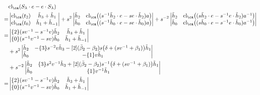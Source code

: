 \begin{example}
\begin{align*}
& \textrm{cl}_\ca ( S_\lambda \cdot e - e \cdot S_\lambda ) \\
=&
\begin{vmatrix}
\textrm{cl}_\ca ( t_2 ) &  \tilde{h}_3 + \tilde{h}_1 \\
\textrm{cl}_\ca ( t_0 ) & \tilde{h}_1 + \tilde{h}_{-1}
\end{vmatrix}
+ s^2
\begin{vmatrix}
\tilde{h}_2 & \textrm{cl}_\ca \big( ( s^{-1} \tilde{h}_2 \cdot e - s e \cdot \tilde{h}_2 ) a \big) \\
\tilde{h}_0 & \textrm{cl}_\ca \big( ( s^{-1} \tilde{h}_0 \cdot e - s e \cdot \tilde{h}_0 ) a \big)
\end{vmatrix} 
+ s^{-2}
\begin{vmatrix}
\tilde{h}_2 & \textrm{cl}_\ca \big( ( s \tilde{h}_2 \cdot e - s^{-1} e \cdot \tilde{h}_2 ) a^{-1} \big) \\
\tilde{h}_0 & \textrm{cl}_\ca \big( ( s \tilde{h}_0 \cdot e - s^{-1} e \cdot \tilde{h}_0 ) a^{-1} \big)
\end{vmatrix} \\
=& 
\begin{vmatrix}
\{2\} ( s v^{-1} - s^{-1} v ) \tilde{h}_2 &  \tilde{h}_3 + \tilde{h}_1 \\
\{0\} ( s^{-1} v^{-1} - s v ) \tilde{h}_0 & \tilde{h}_1 + \tilde{h}_{-1}
\end{vmatrix} \\
&+ s^2
\begin{vmatrix}
\tilde{h}_2 & - \{3\} s^{-2} v \tilde{h}_3 - [2] ( \bar{\beta}_2 - \beta_2 ) s \big( \delta + (s v^{-1} + \beta_{1} ) \big) \tilde{h}_1 \\
\tilde{h}_0 & - \{1\} v \tilde{h}_{1}
\end{vmatrix} \\
&+ s^{-2}
\begin{vmatrix}
\tilde{h}_2 & \{3\} s^2 v^{-1} \tilde{h}_{3} + [2] ( \bar{\beta}_2 - \beta_2 ) s^{-1} \big( \delta + ( s v^{-1} + \beta_{1} ) \big) \tilde{h}_{1} \\
\tilde{h}_0 & \{1\} v^{-1} \tilde{h}_{1}
\end{vmatrix} \\
=& 
\begin{vmatrix}
\{2\} ( s v^{-1} - s^{-1} v ) \tilde{h}_2 &  \tilde{h}_3 + \tilde{h}_1 \\
\{0\} ( s^{-1} v^{-1} - s v ) \tilde{h}_0 & \tilde{h}_1 + \tilde{h}_{-1}
\end{vmatrix} \\

\end{align*}
\end{example}
